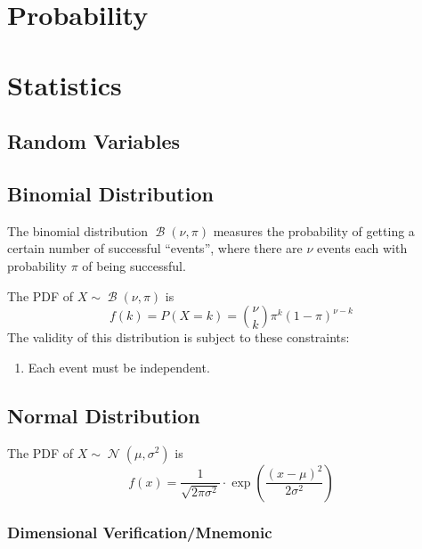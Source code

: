 \documentclass[fleqn,a4paper,11pt]{article}
\DeclareMathOperator{\Normal}{\mathcal{N}}
\DeclareMathOperator{\Binomial}{\mathcal{B}}
\begin{document}
    \section{Probability}

    \section{Statistics}

    \subsection{Random Variables}

    \subsection{Binomial Distribution}


    The binomial distribution \(\Binomial(\nu, \pi)\) measures the probability
    of getting a certain number of successful ``events'', where there are
    \(\nu\) events each with probability \(\pi\) of being successful.

    The PDF of \(X \sim \Binomial(\nu, \pi)\) is
    \begin{equation}
    f(k) = P(X = k) = {\nu \choose k} \pi^k (1 - \pi)^{\nu - k}
    \end{equation}
    The validity of this distribution is subject to these constraints:
    \begin{enumerate}
    \item Each event must be independent.
    \end{enumerate}

    \subsection{Normal Distribution}


    The PDF of \(X \sim \Normal(\mu, \sigma^2)\) is
    \begin{equation}
    f(x) = \frac{1}{\sqrt{2\pi\sigma^2}} \cdot
           \exp(\frac{(x - \mu)^2}{2\sigma^2})
    \end{equation}

    \subsubsection{Dimensional Verification/Mnemonic}
\end{document}
